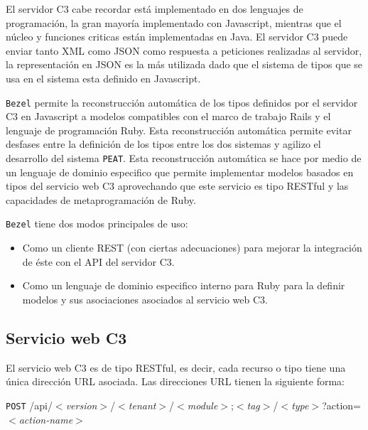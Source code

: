 El servidor C3 cabe recordar está implementado en dos lenguajes de programación, la
gran mayoría implementado con Javascript, mientras que el núcleo y funciones criticas
están implementadas en Java. El servidor C3 puede enviar tanto XML como JSON como
respuesta a peticiones realizadas al servidor, la representación en JSON es la
más utilizada dado que el sistema de tipos que se usa en el sistema esta definido en
Javascript.

\texttt{Bezel} permite la reconstrucción automática de los tipos definidos por el
servidor C3 en Javascript a modelos compatibles con el marco de trabajo Rails
y el lenguaje de programación Ruby. Esta reconstrucción automática permite
evitar desfases entre la definición de los tipos entre los dos sistemas y
agilizo el desarrollo del sistema \texttt{PEAT}. Esta reconstrucción automática
se hace por medio de un lenguaje de dominio especifico que permite implementar
modelos basados en tipos del servicio web C3 aprovechando que este servicio
es tipo RESTful y las capacidades de metaprogramación de Ruby.

\texttt{Bezel} tiene dos modos principales de uso:
\begin{itemize}
\item Como un cliente REST (con ciertas adecuaciones) para mejorar la
  integración de éste con el API del servidor C3.
\item Como un lenguaje de dominio especifico interno para Ruby para la
  definir modelos y sus asociaciones asociados al servicio web C3.
\end{itemize}

\subsection{Servicio web C3}

El servicio web C3 es de tipo RESTful, es decir, cada recurso o tipo tiene una única
dirección URL asociada. Las direcciones URL tienen la siguiente forma:

\vspace{2.5mm}
\texttt{POST} /api/$<$\textit{version}$>$/$<$\textit{tenant}$>$/$<$\textit{module}$>$;$<$\textit{tag}$>$/$<$\textit{type}$>$?action=$<$\textit{action-name}$>$

